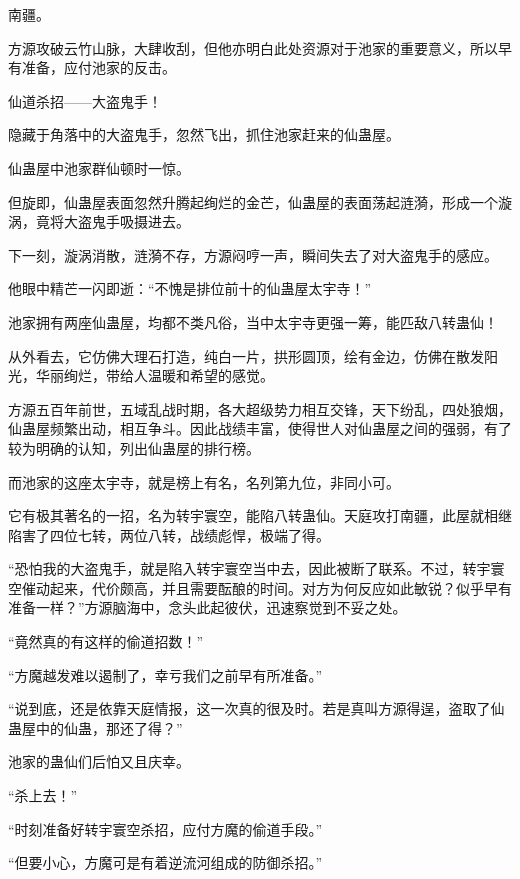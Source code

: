 
\begin{this_body}

南疆。

方源攻破云竹山脉，大肆收刮，但他亦明白此处资源对于池家的重要意义，所以早有准备，应付池家的反击。

仙道杀招——大盗鬼手！

隐藏于角落中的大盗鬼手，忽然飞出，抓住池家赶来的仙蛊屋。

仙蛊屋中池家群仙顿时一惊。

但旋即，仙蛊屋表面忽然升腾起绚烂的金芒，仙蛊屋的表面荡起涟漪，形成一个漩涡，竟将大盗鬼手吸摄进去。

下一刻，漩涡消散，涟漪不存，方源闷哼一声，瞬间失去了对大盗鬼手的感应。

他眼中精芒一闪即逝：“不愧是排位前十的仙蛊屋太宇寺！”

池家拥有两座仙蛊屋，均都不类凡俗，当中太宇寺更强一筹，能匹敌八转蛊仙！

从外看去，它仿佛大理石打造，纯白一片，拱形圆顶，绘有金边，仿佛在散发阳光，华丽绚烂，带给人温暖和希望的感觉。

方源五百年前世，五域乱战时期，各大超级势力相互交锋，天下纷乱，四处狼烟，仙蛊屋频繁出动，相互争斗。因此战绩丰富，使得世人对仙蛊屋之间的强弱，有了较为明确的认知，列出仙蛊屋的排行榜。

而池家的这座太宇寺，就是榜上有名，名列第九位，非同小可。

它有极其著名的一招，名为转宇寰空，能陷八转蛊仙。天庭攻打南疆，此屋就相继陷害了四位七转，两位八转，战绩彪悍，极端了得。

“恐怕我的大盗鬼手，就是陷入转宇寰空当中去，因此被断了联系。不过，转宇寰空催动起来，代价颇高，并且需要酝酿的时间。对方为何反应如此敏锐？似乎早有准备一样？”方源脑海中，念头此起彼伏，迅速察觉到不妥之处。

“竟然真的有这样的偷道招数！”

“方魔越发难以遏制了，幸亏我们之前早有所准备。”

“说到底，还是依靠天庭情报，这一次真的很及时。若是真叫方源得逞，盗取了仙蛊屋中的仙蛊，那还了得？”

池家的蛊仙们后怕又且庆幸。

“杀上去！”

“时刻准备好转宇寰空杀招，应付方魔的偷道手段。”

“但要小心，方魔可是有着逆流河组成的防御杀招。”


\end{this_body}
